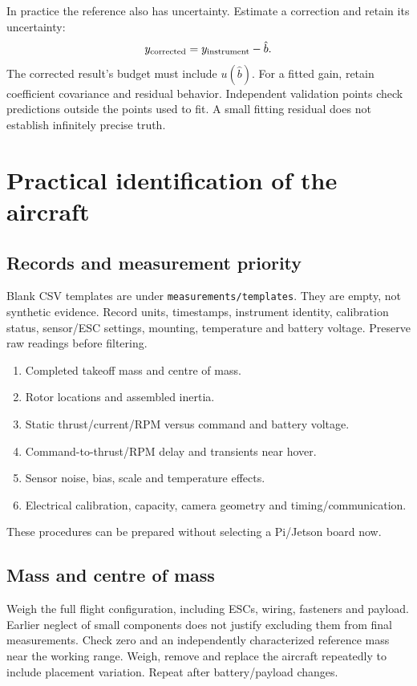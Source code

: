 In practice the reference also has uncertainty. Estimate a correction and retain
its uncertainty:
\begin{equation}
y_{\rm corrected}=y_{\rm instrument}-\hat b.
\end{equation}
The corrected result's budget must include $u(\hat b)$. For a fitted gain, retain
coefficient covariance and residual behavior. Independent validation points check
predictions outside the points used to fit. A small fitting residual does not
establish infinitely precise truth.

\chapter{Practical identification of the aircraft}
\section{Records and measurement priority}
Blank CSV templates are under \texttt{measurements/templates}. They are empty,
not synthetic evidence. Record units, timestamps, instrument identity, calibration
status, sensor/ESC settings, mounting, temperature and battery voltage. Preserve
raw readings before filtering.

\begin{enumerate}
\item Completed takeoff mass and centre of mass.
\item Rotor locations and assembled inertia.
\item Static thrust/current/RPM versus command and battery voltage.
\item Command-to-thrust/RPM delay and transients near hover.
\item Sensor noise, bias, scale and temperature effects.
\item Electrical calibration, capacity, camera geometry and timing/communication.
\end{enumerate}
These procedures can be prepared without selecting a Pi/Jetson board now.

\section{Mass and centre of mass}
Weigh the full flight configuration, including ESCs, wiring, fasteners and payload.
Earlier neglect of small components does not justify excluding them from final
measurements. Check zero and an independently characterized reference mass near
the working range. Weigh, remove and replace the aircraft repeatedly to include
placement variation. Repeat after battery/payload changes.


